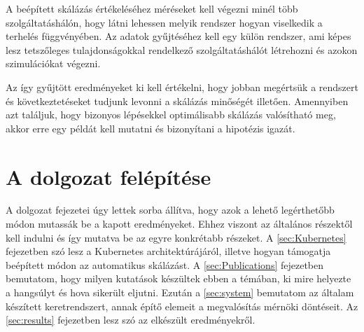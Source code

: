 A beépített skálázás értékeléséhez méréseket kell végezni minél több szolgáltatáshálón, hogy látni lehessen melyik rendszer hogyan viselkedik a terhelés függvényében. Az adatok gyűjtéséhez kell egy külön rendszer, ami képes lesz tetszőleges tulajdonságokkal rendelkező szolgáltatáshálót létrehozni és azokon szimulációkat végezni.

Az így gyűjtött eredményeket ki kell értékelni, hogy jobban megértsük a rendszert és következtetéseket tudjunk levonni a skálázás minőségét illetően. Amennyiben azt találjuk, hogy bizonyos lépésekkel optimálisabb skálázás valósítható meg, akkor erre egy példát kell mutatni és bizonyítani a hipotézis igazát. 


\section{A dolgozat felépítése}
A dolgozat fejezetei úgy lettek sorba állítva, hogy azok a lehető legérthetőbb módon mutassák be a kapott eredményeket. Ehhez viszont az általános részektől kell indulni és így mutatva be az egyre konkrétabb részeket. 
A \ref{sec:Kubernetes} fejezetben szó lesz a Kubernetes architektúrájáról, illetve hogyan támogatja beépített módon az automatikus skálázást. 
A \ref{sec:Publications} fejezetben bemutatom, hogy milyen kutatások készültek ebben a témában, ki mire helyezte a hangsúlyt és hova sikerült eljutni.
Ezután a \ref{sec:system} bemutatom az általam készített keretrendszert, annak építő elemeit a megvalósítás mérnöki döntéseit. 
Az \ref{sec:results} fejezetben lesz szó az elkészült eredményekről.
